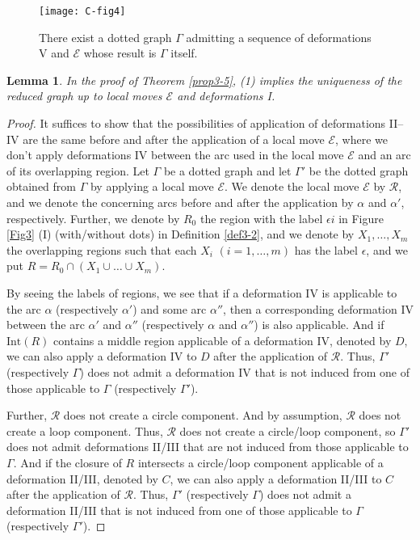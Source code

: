 \documentclass[a4paper,11pt]{amsart}
\numberwithin{equation}{section}
\newtheorem{lemma}[theorem]{Lemma}
\begin{document}
\begin{figure}[ht]
\centering
\texttt{[image: C-fig4]}
\caption{There exist a dotted graph $\Gamma$ admitting a sequence of deformations V and $\mathcal{E}$ whose result is $\Gamma$ itself.}%
\label{C-fig4}
\end{figure}

\begin{lemma}\label{rem915}
 In the proof of Theorem \ref{prop3-5}, (1) implies the uniqueness of the reduced graph up to local moves $\mathcal{E}$ and deformations I. 
\end{lemma}
\begin{proof}

It suffices to show that the possibilities of application of deformations II--IV are the same before and after the application of a local move $\mathcal{E}$, where we don't apply deformations IV between the arc used in the local move $\mathcal{E}$ and an arc of its overlapping region. 
Let $\Gamma$ be a dotted graph and let $\Gamma'$ be the dotted graph obtained from $\Gamma$ by applying a local move $\mathcal{E}$. 
We denote the local move $\mathcal{E}$ by $\mathcal{R}$, 
and we denote the concerning arcs before and after the application by $\alpha$ and $\alpha'$, respectively.  
Further, we denote by $R_0$ the region with the label $\epsilon i$ in Figure \ref{Fig3} (I) (with/without dots) in Definition \ref{def3-2}, and we denote by $X_1, \ldots, X_m$ the overlapping regions such that each $X_i$ $(i=1,\ldots,m)$ has the label $\epsilon$, and we put $R=R_0\cap (X_1 \cup \ldots \cup X_m)$.  

By seeing the labels of regions, we see that 
 if a deformation IV is applicable to the arc $\alpha$ (respectively $\alpha'$) and some arc $\alpha''$,  then a corresponding deformation IV between the arc $\alpha'$ and $\alpha''$ (respectively $\alpha$ and $\alpha''$) is also applicable. 
And if $\mathrm{Int}(R)$ contains a middle region applicable of a deformation IV, denoted by $D$, we can also apply a deformation IV to $D$ after the application of $\mathcal{R}$. 
Thus, 
$\Gamma'$ (respectively $\Gamma$) does not admit a deformation IV that is not induced from one of those applicable to $\Gamma$ (respectively $\Gamma'$). 
 
Further, $\mathcal{R}$ does not create a circle component. 
And by assumption, $\mathcal{R}$ does not create a loop component. 
Thus, $\mathcal{R}$ does not create a circle/loop component, so $\Gamma'$ does not admit deformations II/III that are not induced from those applicable to $\Gamma$. 
%
And if the closure of $R$ intersects a circle/loop component applicable of a deformation II/III, denoted by $C$, we can also apply a deformation II/III to $C$ after the application of $\mathcal{R}$. 
Thus, 
$\Gamma'$ (respectively $\Gamma$) does not admit a deformation II/III that is not induced from one of those applicable to $\Gamma$ (respectively $\Gamma'$). 



\end{proof}
\end{document}
